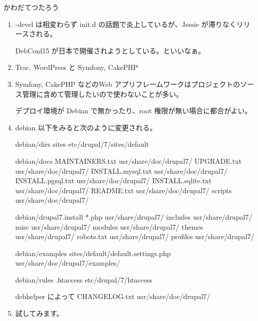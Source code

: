 \documentclass[mingoth,a4paper]{jsarticle}
\begin{document}
\begin{prework}{ かわだてつたろう }
  \begin{enumerate}
  \item  -devel は相変わらず init.d の話題で炎上しているが、Jessie が滞りなくリリースされる。

    DebConf15 が日本で開催されようとしている。といいなぁ。
  \item Trac, WordPress と Symfony, CakePHP
  \item Symfony, CakePHP などのWeb アプリフレームワークはプロジェクトのソース管理に含めて管理したいので使わないことが多い。

    デプロイ環境が Debian で無かったり、root 権限が無い場合に都合がよい。
  \item debian 以下をみると次のように変更される。
    \begin{commandline}
debian/dirs
  sites			etc/drupal/7/sites/default

debian/docs
  MAINTAINERS.txt	usr/share/doc/drupal7/
  UPGRADE.txt		usr/share/doc/drupal7/
  INSTALL.mysql.txt	usr/share/doc/drupal7/
  INSTALL.pgsql.txt	usr/share/doc/drupal7/
  INSTALL.sqlite.txt	usr/share/doc/drupal7/
  README.txt		usr/share/doc/drupal7/
  scripts		usr/share/doc/drupal7/

debian/drupal7.install
  *.php			usr/share/drupal7/
  includes		usr/share/drupal7/
  misc			usr/share/drupal7/
  modules		usr/share/drupal7/
  themes		usr/share/drupal7/
  robots.txt		usr/share/drupal7/
  profiles		usr/share/drupal7/

debian/examples
  sites/default/default.settings.php	usr/share/doc/drupal7/examples/

debian/rules
  .htaccess		etc/drupal/7/htaccess

debhelper によって
  CHANGELOG.txt		usr/share/doc/drupal7/
    \end{commandline}
\item 試してみます。
  \end{enumerate}
\end{prework}
\end{document}
